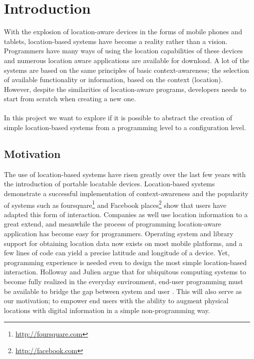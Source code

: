 
\section{Introduction}
\label{sec.introduction}
With the explosion of location-aware devices in the forms of mobile phones and tablets, location-based systems have become a reality rather than a vision. Programmers have many ways of using the location capabilities of these devices and numerous location aware applications are available for download. A lot of the systems are based on the same principles of basic context-awareness; the selection of available functionality or information, based on the context (location). However, despite the similarities of location-aware programs, developers needs to start from scratch when creating a new one. 
\\\\
In this project we want to explore if it is possible to abstract the creation of simple location-based systems from a programming level to a configuration level.


\subsection{Motivation} %
\label{sub:context_and_motivation}
The use of location-based systems have risen greatly over the last few years with the introduction of portable locatable devices. Location-based systems demonstrate a successful implementation of context-awareness and the popularity of systems such as foursquare\footnote{\url{http://foursquare.com}} and Facebook places\footnote{\url{http://facebook.com}} show that users have adapted this form of interaction. Companies as well use location information to a great extend, and meanwhile the process of programming location-aware application has become easy for programmers. Operating system and library support for obtaining location data now exists on most mobile platforms, and a few lines of code can yield a precise latitude and longitude of a device. Yet, programming experience is needed even to design the most simple location-based interaction. Holloway and Julien argue that for ubiquitous computing systems to become fully realized in the everyday environment, end-user programming must be available to bridge the gap between system and user \cite{Holloway:2010:CEP:1882362.1882398}. This will also serve as our motivation; to empower end users with the ability to augment physical locations with digital information in a simple non-programming way.

